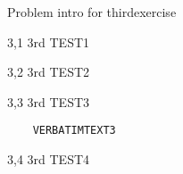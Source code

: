 \begin{intro}
Problem intro for thirdexercise
\end{intro}
\begin{problem}%
3,1
  3rd TEST1
\end{problem}
\begin{problem}
3,2
  3rd TEST2
\end{problem}
\begin{problem}
3,3
  3rd TEST3
  \begin{verbatim}
    VERBATIMTEXT3
  \end{verbatim}
\end{problem}
\begin{problem}
3,4
  3rd TEST4
\end{problem}
